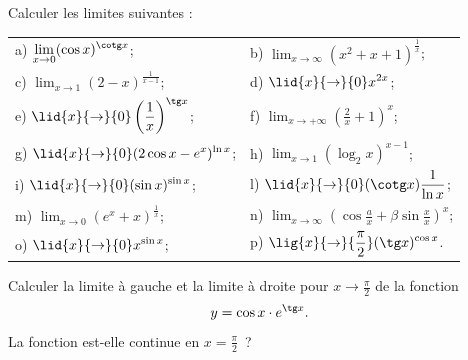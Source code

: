 \documentclass[12pt,french,oneside,a4paper]{memoir} %
\begin{document}
 \begin{exo}
Calculer les limites suivantes :
   
   \begin{tabular}{ll}
   a) $\displaystyle{\lim_{x\to 0}(\cos x)^{\cotg
   x}}$;\qquad\qquad& 
   b) $\displaystyle{\lim_{x\to
   \infty}(x^2+x+1)^{\frac{1}{x}}}$;\\[3mm]
   c) $\displaystyle{\lim_{x\to 1}(2-x)^{\frac{1}{x-1}}}$;\qquad\qquad&
   d) $\displaystyle{\lid{x}{\to}{0}x^{2x}}$;\\[3mm]
   e) $\displaystyle{\lid{x}{\to}{
   0}\left(\frac{1}{x}\right)^{\tg x}}$;\qquad\qquad&
   f) $\displaystyle{\lim_{x\to+\infty}(\frac{2}{x}+1)^x}$;\\[3mm]
   g)
   $\displaystyle{\lid{x}{\to}{0}(2\cos
   x-e^x)^{\ln x}}$;\qquad\qquad& 
   h) $\displaystyle{\lim_{x\to 1}(\log_2 x)^{x-1}}$;\\[3mm]
   i) $\displaystyle{\lid{x}{\to}
   {0}(\sin x)^{\sin x}}$;\qquad\qquad& 
   l) $\displaystyle{\lid{x}{\to}
   {0}(\cotg x)\frac{1}{\ln x}}$;\\[3mm]
   m) $\displaystyle{\lim_{x\to 0}(e^x+x)^{\frac{1}{x}}}$;\qquad\qquad&
   n) $\displaystyle{\lim_{x\to
   \infty}(\cos\frac{a}{x}+\beta\sin\frac{x}{x})^x}$;\\[3mm]
   o) $\displaystyle{\lid{x}{\to}
   {0}x^{\sin x}}$;\qquad\qquad&
   p) $\displaystyle{\lig{x}{\to}
   {\frac{\pi}{2}}(\tg x)^{\cos x}}$.
   \end{tabular}
   
 \end{exo}

 \begin{exo}
Calculer la limite à gauche et la limite à droite pour
   $\displaystyle{x\rightarrow\frac{\pi}{2}}$ de la fonction
   \begin{equation*}
   y=\cos x\cdot e^{\tg x}.
\end{equation*}
   La fonction est-elle continue en $\displaystyle{x=\frac{\pi}{2}}$~?
   
 \end{exo}
\end{document}
